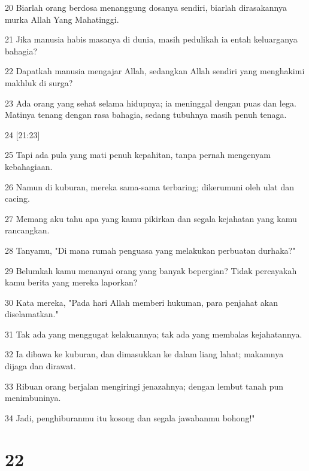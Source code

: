 \par 20 Biarlah orang berdosa menanggung dosanya sendiri, biarlah dirasakannya murka Allah Yang Mahatinggi.
\par 21 Jika manusia habis masanya di dunia, masih pedulikah ia entah keluarganya bahagia?
\par 22 Dapatkah manusia mengajar Allah, sedangkan Allah sendiri yang menghakimi makhluk di surga?
\par 23 Ada orang yang sehat selama hidupnya; ia meninggal dengan puas dan lega. Matinya tenang dengan rasa bahagia, sedang tubuhnya masih penuh tenaga.
\par 24 [21:23]
\par 25 Tapi ada pula yang mati penuh kepahitan, tanpa pernah mengenyam kebahagiaan.
\par 26 Namun di kuburan, mereka sama-sama terbaring; dikerumuni oleh ulat dan cacing.
\par 27 Memang aku tahu apa yang kamu pikirkan dan segala kejahatan yang kamu rancangkan.
\par 28 Tanyamu, "Di mana rumah penguasa yang melakukan perbuatan durhaka?"
\par 29 Belumkah kamu menanyai orang yang banyak bepergian? Tidak percayakah kamu berita yang mereka laporkan?
\par 30 Kata mereka, "Pada hari Allah memberi hukuman, para penjahat akan diselamatkan."
\par 31 Tak ada yang menggugat kelakuannya; tak ada yang membalas kejahatannya.
\par 32 Ia dibawa ke kuburan, dan dimasukkan ke dalam liang lahat; makamnya dijaga dan dirawat.
\par 33 Ribuan orang berjalan mengiringi jenazahnya; dengan lembut tanah pun menimbuninya.
\par 34 Jadi, penghiburanmu itu kosong dan segala jawabanmu bohong!"

\chapter{22}

